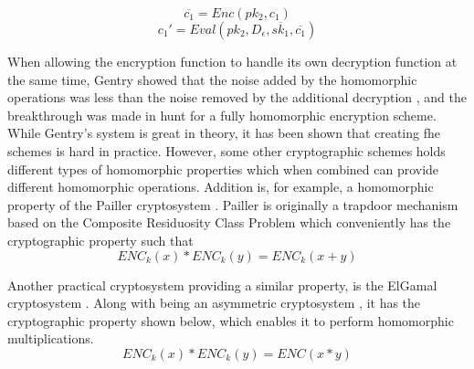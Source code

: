 \begin{equation}
\label{enc_c_1}
\overline{c_1} = Enc(pk_2, c_1)
\end{equation}
\begin{equation}
\label{eval_c1_pk2}
c_1' = Eval(pk_2, D_{\epsilon}, \overline{sk_1}, \overline{c_1})
\end{equation}

When allowing the encryption function to handle its own decryption function at the same time, Gentry showed that the noise added by the homomorphic operations was less than the noise removed by the additional decryption \cite{Gentry_computing_arb_func_enc_data}, and the breakthrough was made in hunt for a fully homomorphic encryption scheme. While Gentry's system is great in theory, it has been shown that creating \gls{fhe} schemes is hard in practice. However, some other cryptographic schemes holds different types of homomorphic properties which when combined can provide different homomorphic operations. Addition is, for example, a homomorphic property of the Pailler cryptosystem \citep{Paillier}. Pailler is originally a trapdoor mechanism based on the Composite Residuosity Class Problem which conveniently has the cryptographic property such that \[ENC_k(x) * ENC_k(y) = ENC_k(x + y)\]

Another practical cryptosystem providing a similar property, is the ElGamal cryptosystem \cite{elgamal}. Along with being an asymmetric cryptosystem , it has the cryptographic property shown below, which enables it to perform homomorphic multiplications.  \[ENC_k(x) * ENC_k(y) = ENC(x * y)\]


